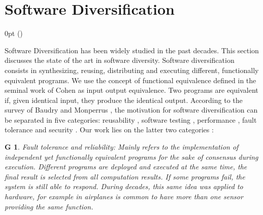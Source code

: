 \section{Software Diversification}

\def\checkmark{\tikz\fill[scale=0.4](0,.35) -- (.25,0) -- (1,.7) -- (.25,.15) -- cycle;} 

  {\topsep}%
  {\topsep}%
  {\itshape}%
  {0pt}%
  {\bfseries}%
  {}%
  { }%
  {()\textnormal{}}

\def\Gnospace~{G{}}
\theoremstyle{sota}
\newtheorem{goal}{G}
\providecommand*{\definitionautorefname}{\Gnospace}
\newcommand{\goalautorefname}{\Gnospace}


\def\Snospace~{S{}}
\theoremstyle{sota}
\newtheorem{strategy}{S}
\providecommand*{\definitionautorefname}{\Snospace}
\newcommand{\strategyautorefname}{\Snospace}

\def\Unospace~{U{}}
\theoremstyle{sota}
\newtheorem{usage}{U}
\providecommand*{\definitionautorefname}{\Unospace}
\newcommand{\usageautorefname}{\Unospace}

Software Diversification has been widely studied in the past decades. This section discusses the state of the art in software diversity.
Software diversification consists in synthesizing, reusing, distributing and executing different, functionally equivalent programs. We use the concept of functional equivalence defined in the seminal work of Cohen \etal \cite{cohen1993operating} as input output equivalence. Two programs are equivalent if, given identical input, they produce the identical output.
According to the survey of Baudry and Monperrus \cite{natural_diversity}, the motivation for software diversification can be separated in five categories: reusability \cite{pohl2005software}, software testing \cite{Chen2010AdaptiveRT}, performance \cite{10.1145/2025113.2025133}, fault tolerance \cite{1659219} and security \cite{cohen1993operating}. Our work lies on the latter two categories : 

\begin{goal}{Fault tolerance and reliability:}
    \label{goal:reliability}
    \normalfont
    Mainly refers to the implementation of independent yet functionally equivalent programs for the sake of consensus during execution. Different programs are deployed and executed at the same time, the final result is selected from all computation results. If some programs fail, the system is still able to respond. During decades, this same idea was applied to hardware, for example in airplanes is common to have more than one sensor providing the same function. 
\end{goal}

